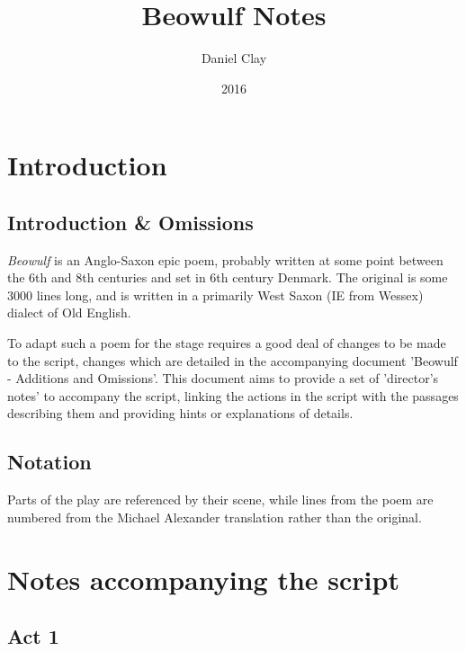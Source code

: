 \documentclass[a4paper]{article}
\begin{document}
\title{Beowulf Notes}
\date{2016}
\author{
Daniel Clay \\ 
}
\maketitle

\section{Introduction}

\subsection{Introduction \& Omissions}%

\textit{Beowulf} is an Anglo-Saxon epic poem, probably written at some point 
between the 6th and 8th centuries and set in 6th century Denmark. The original
is some 3000 lines long, and is written in a primarily West Saxon (IE from Wessex)
dialect of Old English.

To adapt such a poem for the stage requires a good deal of changes to be made
to the script, changes which are detailed in the accompanying document
'Beowulf - Additions and Omissions'. This document aims to provide a set of
'director's notes' to accompany the script, linking the actions in the script
with the passages describing them and providing hints or explanations of details.

\subsection{Notation}%

Parts of the play are referenced by their scene, while lines from the poem are
numbered from the Michael Alexander translation rather than the original.

\section{Notes accompanying the script}

\subsection{Act 1}%
\end{document}
